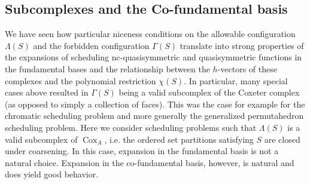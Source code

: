 \documentclass[12pt,reqno]{amsart}
\numberwithin{definition}{section}
\newtheorem{proposition}[definition]{Proposition}
\theoremstyle{definition}
\newcommand{\cox}{\operatorname{Cox}}
\newcommand{\floor}[1]{\lfloor {#1} \rfloor}
\newcommand{\ceil}[1]{\lceil {#1} \rceil}
\newcommand{\allow}{\Lambda} %
\newcommand{\poly}{\chi} %
\newcommand{\forb}{\Gamma} %
\newcommand{\comment}[1]{\textsf{\footnotesize #1}}
\begin{document}





\subsection{Subcomplexes and the Co-fundamental basis}



We have seen how particular niceness conditions on the allowable
configuration $\allow(S)$ and the forbidden configuration $\forb(S)$
translate into strong properties of the expansions of scheduling nc-quasisymmetric and quasisymmetric functions  in the fundamental bases and the relationship between the
$h$-vectors of these complexes and the polynomial restriction
$\poly(S)$. 
 In particular, many special cases above resulted in
$\forb(S)$ being a valid subcomplex of the Coxeter complex (as
opposed to simply a collection of faces). This was the case for example for the chromatic scheduling problem and more generally the generalized permutahedron scheduling problem. 
 Here we consider scheduling problems such that $\allow(S)$ is a valid
 subcomplex of $\cox_A$, i.e. the ordered set partitions satisfying
 $S$ are closed under coarsening.  In this case, expansion in the
 fundamental basis is not a natural choice.  Expansion in the
 co-fundamental basis, however, is natural and does yield good
 behavior. 
\end{document}

